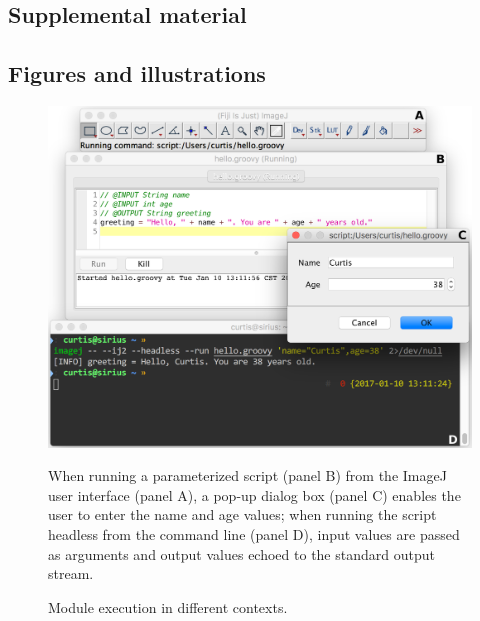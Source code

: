 \documentclass{bmcart}
\begin{document}
\begin{backmatter}


\section*{Supplemental material}

\subsection*{Figures and illustrations}
  \renewcommand\thefigure{S.\arabic{figure}}
  \setcounter{figure}{0}

  \begin{figure}[h!]
    \caption{Module execution in different contexts.}
    \includegraphics[width=4.75in,natwidth=1396,natheight=1126]{figure-s.1/module-execution-labeled.png}
    \begin{flushleft}
      When running a parameterized script (panel B) from the ImageJ user
      interface (panel A), a pop-up dialog box (panel C) enables the user to
      enter the name and age values; when running the script headless from the
      command line (panel D), input values are passed as arguments and output
      values echoed to the standard output stream.
    \end{flushleft}
  \end{figure}


\end{backmatter}
\end{document}
